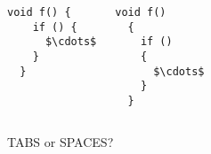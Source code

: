 \begin{frame}[fragile]{}

  \begin{columns}
      \begin{lstlisting}[style = Cstyle]
  void f() {
    if () {
      $\cdots$
    }
  }
      \end{lstlisting}
      \begin{lstlisting}[style = Cstyle]
  void f()
  {
    if () 
    {
      $\cdots$
    }
  }
      \end{lstlisting}
  \end{columns}
\end{frame}

\begin{frame}{}
  \centerline{\Large TABS or SPACES?}
\end{frame}

\begin{frame}{}
\end{frame}

\begin{frame}{}
  \centerline{\Large {}}
  \vspace{0.20cm}
  \centerline{\large {}}
\end{frame}

